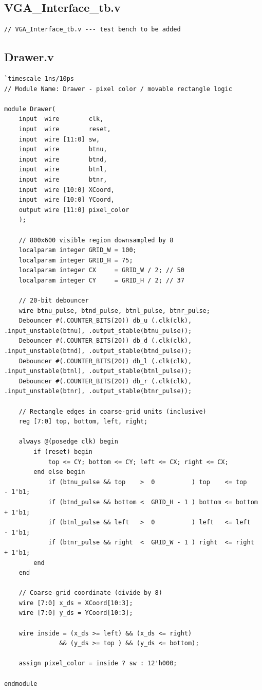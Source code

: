 \documentclass[11pt,a4paper]{article}
\begin{document}
\newpage
\subsection*{VGA\_Interface\_tb.v}
\begin{lstlisting}
// VGA_Interface_tb.v --- test bench to be added
\end{lstlisting}

\newpage
\subsection*{Drawer.v}
\begin{lstlisting}
`timescale 1ns/10ps
// Module Name: Drawer - pixel color / movable rectangle logic

module Drawer(
    input  wire        clk,
    input  wire        reset,
    input  wire [11:0] sw,
    input  wire        btnu,
    input  wire        btnd,
    input  wire        btnl,
    input  wire        btnr,
    input  wire [10:0] XCoord,
    input  wire [10:0] YCoord,
    output wire [11:0] pixel_color
    );

    // 800x600 visible region downsampled by 8
    localparam integer GRID_W = 100;
    localparam integer GRID_H = 75;
    localparam integer CX     = GRID_W / 2; // 50
    localparam integer CY     = GRID_H / 2; // 37

    // 20-bit debouncer
    wire btnu_pulse, btnd_pulse, btnl_pulse, btnr_pulse;
    Debouncer #(.COUNTER_BITS(20)) db_u (.clk(clk), .input_unstable(btnu), .output_stable(btnu_pulse));
    Debouncer #(.COUNTER_BITS(20)) db_d (.clk(clk), .input_unstable(btnd), .output_stable(btnd_pulse));
    Debouncer #(.COUNTER_BITS(20)) db_l (.clk(clk), .input_unstable(btnl), .output_stable(btnl_pulse));
    Debouncer #(.COUNTER_BITS(20)) db_r (.clk(clk), .input_unstable(btnr), .output_stable(btnr_pulse));

    // Rectangle edges in coarse-grid units (inclusive)
    reg [7:0] top, bottom, left, right;

    always @(posedge clk) begin
        if (reset) begin
            top <= CY; bottom <= CY; left <= CX; right <= CX;
        end else begin
            if (btnu_pulse && top    >  0          ) top    <= top    - 1'b1;
            if (btnd_pulse && bottom <  GRID_H - 1 ) bottom <= bottom + 1'b1;
            if (btnl_pulse && left   >  0          ) left   <= left   - 1'b1;
            if (btnr_pulse && right  <  GRID_W - 1 ) right  <= right  + 1'b1;
        end
    end

    // Coarse-grid coordinate (divide by 8)
    wire [7:0] x_ds = XCoord[10:3];
    wire [7:0] y_ds = YCoord[10:3];

    wire inside = (x_ds >= left) && (x_ds <= right)
               && (y_ds >= top ) && (y_ds <= bottom);

    assign pixel_color = inside ? sw : 12'h000;

endmodule
\end{lstlisting}
\end{document}
